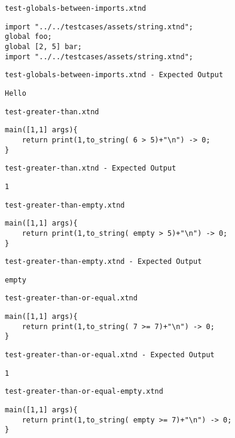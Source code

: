 \medskip \noindent \texttt{test-globals-between-imports.xtnd}


\begin{lstlisting}
import "../../testcases/assets/string.xtnd";
global foo;
global [2, 5] bar;
import "../../testcases/assets/string.xtnd";
\end{lstlisting}


\medskip \noindent \texttt{test-globals-between-imports.xtnd - Expected Output}


\begin{lstlisting}
Hello
\end{lstlisting}


\medskip \noindent \texttt{test-greater-than.xtnd}


\begin{lstlisting}
main([1,1] args){
	return print(1,to_string( 6 > 5)+"\n") -> 0;
}
\end{lstlisting}


\medskip \noindent \texttt{test-greater-than.xtnd - Expected Output}


\begin{lstlisting}
1
\end{lstlisting}


\medskip \noindent \texttt{test-greater-than-empty.xtnd}


\begin{lstlisting}
main([1,1] args){
	return print(1,to_string( empty > 5)+"\n") -> 0;
}
\end{lstlisting}


\medskip \noindent \texttt{test-greater-than-empty.xtnd - Expected Output}


\begin{lstlisting}
empty
\end{lstlisting}


\medskip \noindent \texttt{test-greater-than-or-equal.xtnd}


\begin{lstlisting}
main([1,1] args){
	return print(1,to_string( 7 >= 7)+"\n") -> 0;
}
\end{lstlisting}


\medskip \noindent \texttt{test-greater-than-or-equal.xtnd - Expected Output}


\begin{lstlisting}
1
\end{lstlisting}


\medskip \noindent \texttt{test-greater-than-or-equal-empty.xtnd}


\begin{lstlisting}
main([1,1] args){
	return print(1,to_string( empty >= 7)+"\n") -> 0;
}
\end{lstlisting}


